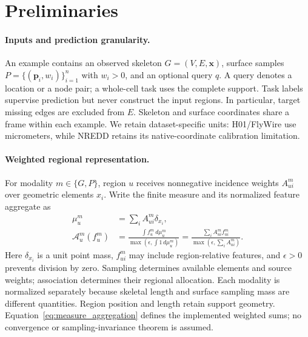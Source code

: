 \section{Preliminaries}
\label{sec:prelim}

\paragraph{Inputs and prediction granularity.}
An example contains an observed skeleton $G=(V,E,\mathbf{x})$, surface samples $P=\{(\mathbf{p}_i,w_i)\}_{i=1}^{n}$ with $w_i>0$, and an optional query $q$. A query denotes a location or a node pair; a whole-cell task uses the complete support. Task labels supervise prediction but never construct the input regions. In particular, target missing edges are excluded from $E$. Skeleton and surface coordinates share a frame within each example. We retain dataset-specific units: H01/FlyWire use micrometers, while NREDD retains its native-coordinate calibration limitation.

\paragraph{Weighted regional representation.}
For modality $m\in\{G,P\}$, region $u$ receives nonnegative incidence weights $A^m_{ui}$ over geometric elements $x_i$. Write the finite measure and its normalized feature aggregate as
\begin{equation}
\begin{aligned}
 \mu_u^m&=\sum_i A^m_{ui}\delta_{x_i},\\
 \mathcal{A}_u^m(f_u^m)&=
 \frac{\int f_u^m\,d\mu_u^m}{\max(\epsilon,\int1\,d\mu_u^m)}
 =\frac{\sum_i A^m_{ui}f^m_{ui}}{\max(\epsilon,\sum_i A^m_{ui})}.
\end{aligned}
\label{eq:measure_aggregation}
\end{equation}
Here $\delta_{x_i}$ is a unit point mass, $f^m_{ui}$ may include region-relative features, and $\epsilon>0$ prevents division by zero. Sampling determines available elements and source weights; association determines their regional allocation. Each modality is normalized separately because skeletal length and surface sampling mass are different quantities. Region position and length retain support geometry. Equation~\ref{eq:measure_aggregation} defines the implemented weighted sums; no convergence or sampling-invariance theorem is assumed.
